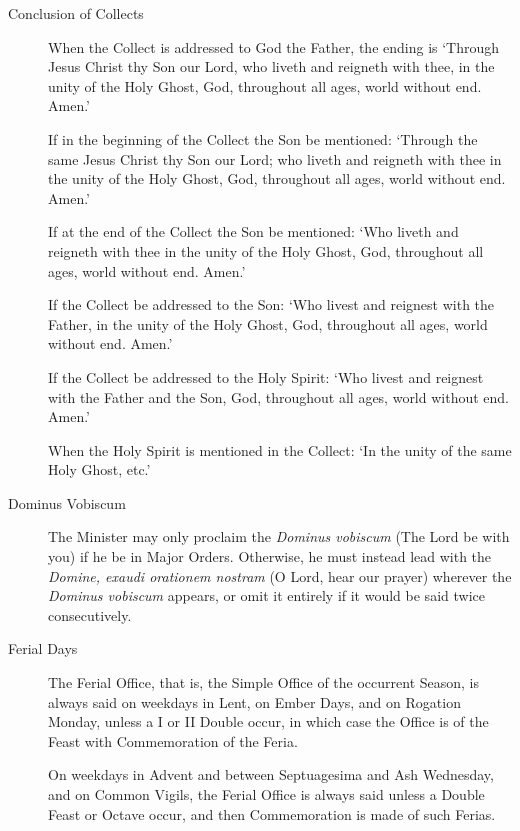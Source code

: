 \begin{description}
\item[Conclusion of Collects] When the Collect is addressed to God the Father, the ending is `Through Jesus Christ thy Son our Lord, who liveth and reigneth with thee, in the unity of the Holy Ghost, God, throughout all ages, world without end. Amen.'\par
If in the beginning of the Collect the Son be mentioned: `Through the same Jesus Christ thy Son our Lord; who liveth and reigneth with thee in the unity of the Holy Ghost, God, throughout all ages, world without end. Amen.'\par
If at the end of the Collect the Son be mentioned: `Who liveth and reigneth with thee in the unity of the Holy Ghost, God, throughout all ages, world without end. Amen.'\par
If the Collect be addressed to the Son: `Who livest and reignest with the Father, in the unity of the Holy Ghost, God, throughout all ages, world without end. Amen.'\par
If the Collect be addressed to the Holy Spirit: `Who livest and reignest with the Father and the Son, God, throughout all ages, world without end. Amen.'\par
When the Holy Spirit is mentioned in the Collect: `In the unity of the same Holy Ghost, etc.'
\item[Dominus Vobiscum] The Minister may only proclaim the \emph{Dominus vobiscum} (The Lord be with you) if he be in Major Orders. Otherwise, he must instead lead with the \emph{Domine, exaudi orationem nostram} (O Lord, hear our prayer) wherever the \emph{Dominus vobiscum} appears, or omit it entirely if it would be said twice consecutively.
\item[Ferial Days] The Ferial Office, that is, the Simple Office of the occurrent Season, is always said on weekdays in Lent, on Ember Days, and on Rogation Monday, unless a I or II Double occur, in which case the Office is of the Feast with Commemoration of the Feria.\par
On weekdays in Advent and between Septuagesima and Ash Wednesday, and on Common Vigils, the Ferial Office is always said unless a Double Feast or Octave occur, and then Commemoration is made of such Ferias.\par

\end{description}
